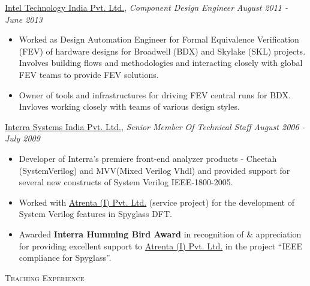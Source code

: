 \documentclass[9pt]{article}
\newenvironment{changemargin}[2]{%
  \begin{list}{}{%
    \setlength{\topsep}{0pt}%
    \setlength{\leftmargin}{#1}%
    \setlength{\rightmargin}{#2}%
    \setlength{\listparindent}{\parindent}%
    \setlength{\itemindent}{\parindent}%
    \setlength{\parsep}{\parskip}%
  }%
  \item[]}{\end{list}
}
\newcommand{\lineover}{
	\begin{changemargin}{-0.05in}{-0.05in}
		\vspace*{-8pt}
		\hrulefill \\
		\vspace*{-2pt}
	\end{changemargin}
}
\newcommand{\header}[1]{
	\begin{changemargin}{-0.5in}{-0.5in}
		\scshape{#1}\\
  	\lineover
	\end{changemargin}
}
\newenvironment{body} {
	\vspace*{-16pt}
	\begin{changemargin}{-0.25in}{-0.5in}
  }	
	{\end{changemargin}
}
\begin{document}
\begin{body}
	\href{http://www.intel.in/content/www/in/en/homepage.html}{Intel Technology India Pvt. Ltd.}, \emph{Component Design Engineer} \hfill \emph{August 2011 - June 2013}\\
	\vspace*{-4pt}
	\begin{itemize} \itemsep -0pt  %
                \item Worked as Design Automation Engineer for Formal Equivalence Verification (FEV) of hardware designs for Broadwell (BDX) and Skylake (SKL) projects. Involves
                building flows and methodologies and interacting closely with
                global FEV teams to provide FEV solutions.
                \item Owner of tools and infrastructures for driving
                FEV central runs for  BDX. Invloves working closely with teams of various
                design styles.
                \end{itemize}

	\href{http://www.interrasystems.com/}{Interra Systems India Pvt. Ltd.}, \emph{Senior Member Of Technical Staff} \hfill \emph{August 2006 - July 2009}\\
	\vspace*{-4pt}
	\begin{itemize} \itemsep -0pt
		\item Developer of Interra's premiere front-end analyzer products - Cheetah (SystemVerilog) and MVV(Mixed Verilog Vhdl) and 
		provided support for several new constructs of System Verilog IEEE-1800-2005. 
		\item Worked with \href{http://www.atrenta.com/}{Atrenta (I) Pvt. Ltd.} (service project) for the development of System Verilog features in Spyglass DFT.
		\item Awarded \textbf{Interra Humming Bird Award} in recognition of \& appreciation for providing excellent support to \href{}{Atrenta (I) Pvt. Ltd.} in the project ``IEEE compliance for Spyglass''.
	\end{itemize}
\end{body}

\smallskip

\header{Teaching Experience}
\end{document}
